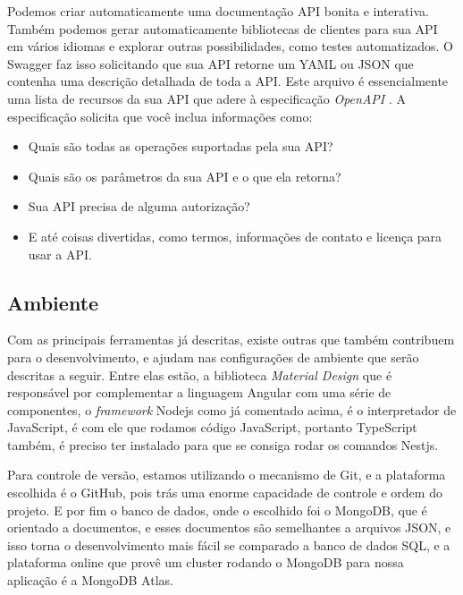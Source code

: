 Podemos criar automaticamente uma documentação API bonita e interativa. Também podemos gerar automaticamente bibliotecas de clientes para sua API em vários idiomas e explorar outras possibilidades, como testes automatizados. O Swagger faz isso solicitando que sua API retorne um YAML ou JSON que contenha uma descrição detalhada de toda a API. Este arquivo é essencialmente uma lista de recursos da sua API que adere à especificação \textit{OpenAPI} \cite{shockey2020Swagger}. A especificação solicita que você inclua informações como:

\begin{itemize}
    \item Quais são todas as operações suportadas pela sua API? 
    \item Quais são os parâmetros da sua API e o que ela retorna?   
    \item Sua API precisa de alguma autorização?
    \item E até coisas divertidas, como termos, informações de contato e licença para usar a API.
\end{itemize}

\subsection{Ambiente}
Com as principais ferramentas já descritas, existe outras que também contribuem para o desenvolvimento, e ajudam nas configurações de ambiente que serão descritas a seguir. Entre elas estão, a biblioteca \textit{Material Design} que é responsável por complementar a linguagem Angular com uma série de componentes, o \textit{framework} Nodejs como já comentado acima, é o interpretador de JavaScript, é com ele que rodamos código JavaScript, portanto TypeScript também, é preciso ter instalado para que se consiga rodar os comandos Nestjs. 

Para controle de versão, estamos utilizando o mecanismo de Git, e a plataforma escolhida é o GitHub, pois trás uma enorme capacidade de controle e ordem do projeto. E por fim o banco de dados, onde o escolhido foi o MongoDB, que é orientado a documentos, e esses documentos são semelhantes a arquivos JSON, e isso torna o desenvolvimento mais fácil se comparado a banco de dados SQL, e a plataforma online que provê um cluster rodando o MongoDB para nossa aplicação é a MongoDB Atlas.


\
